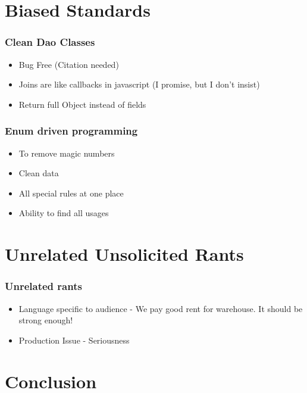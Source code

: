 \documentclass{beamer}
\begin{document}
\section{Biased Standards}

\begin{frame}[fragile]
\frametitle{Clean Dao Classes}
\begin{itemize}
	\item Bug Free (Citation needed)
	\item Joins are like callbacks in javascript (I promise, but I don't insist)
	\item Return full Object instead of fields
\end{itemize}
\end{frame}

\begin{frame}[fragile]
\frametitle{Enum driven programming}
\begin{itemize}
	\item To remove magic numbers
	\item Clean data
	\item All special rules at one place
	\item Ability to find all usages
\end{itemize}
\end{frame}

\section{Unrelated Unsolicited Rants}

\begin{frame}[fragile]
\frametitle{Unrelated rants}
\begin{itemize}
	\item Language specific to audience - We pay good rent for warehouse. It should be strong enough!
	\item Production Issue - Seriousness
\end{itemize}
\end{frame}

\section{Conclusion}

\section*{}
\end{document}
